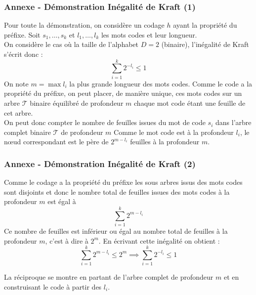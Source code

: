 \documentclass[aspectratio=43]{beamer}
\begin{document}
\begin{frame}
    \frametitle{Annexe - Démonstration Inégalité de Kraft (1)}

    \small
    Pour toute la démonstration, on considère un codage $h$ ayant la propriété du préfixe. Soit $s_1, \dots , s_k$ et $l_1, \dots , l_k$ les mots codes et leur
    longueur. \\
    On considère le cas où la taille de l'alphabet $D = 2$ (binaire), l'inégalité de Kraft s'écrit donc :
    $$ \sum_{i = 1}^{k} 2^{-l_i} \leqslant 1$$
    On note $m = \max l_i$ la plus grande longueur des mots codes. Comme le code a la propriété du préfixe, on
    peut placer, de manière unique, ces mots codes sur un arbre $\mathcal{T}$ binaire équilibré de profondeur $m$ chaque mot code étant une feuille de cet arbre.
    \\
    On peut donc compter le nombre de feuilles issues du mot de code $s_i$ dans l'arbre complet binaire $\mathcal{T}$ de profondeur $m$
    Comme le mot code est à la profondeur $l_i$, le n\oe{ud} correspondant est le père de $2^{m - l_i}$ feuilles à la profondeur $m$. \\

\end{frame}

\begin{frame}
    \frametitle{Annexe - Démonstration Inégalité de Kraft (2)}

    \small
    Comme le codage a la propriété du préfixe les sous arbres issus des mots codes sont disjoints et donc le nombre
    total de feuilles issues des mots codes à la profondeur $m$ est égal à
    $$\sum_{i = 1}^{k} 2^{m-l_i}$$
    Ce nombre de feuilles est inférieur ou égal au nombre total de feuilles à la profondeur $m$, c’est à dire à $2^m$. En écrivant cette inégalité on obtient : 
    $$\sum_{i = 1}^{k} 2^{m-l_i} \leqslant 2^m \implies \sum_{i = 1}^{k} 2^{-l_i} \leqslant 1$$

    \vspace*{2em}

    La réciproque se montre en partant de l'arbre complet de profondeur $m$ et en construisant le code à partir des $l_i$.

\end{frame}
\end{document}
